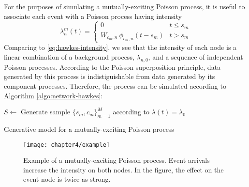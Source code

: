 		For the purposes of simulating a mutually-exciting Poisson process, it is useful to associate each event with a Poisson process having intensity
		\begin{equation}
			\lambda_n^m(t) = \begin{cases}
						             0 & t \le s_m \\
						             W_{c_m, n} \ \phi_{c_m, n}(t - s_m) & t > s_m
						      		 \end{cases}
		\end{equation}
		Comparing to \eqref{eq:hawkes-intensity}, we see that the intensity of each node is a linear combination of a background process, $\lambda_{n,0}$, and a sequence of independent Poisson processes. According to the Poisson superposition principle, data generated by this process is indistiguishable from data generated by its component processes. Therefore, the process can be simulated according to Algorithm \ref{algo:network-hawkes}:

		\begin{algorithm}
				\begin{algorithmic}
					\vspace{1mm}
					\STATE $S \gets$ Generate sample $\{s_m, c_m\}_{m=1}^M$ according to $\lambda(t) = \lambda_0$
					\REPEAT
						\ENDFOR
			\end{algorithmic}
			\caption{Generative model for a mutually-exciting Poisson process}
			\label{algo:network-hawkes}
		\end{algorithm}

		\begin{figure}[t]
			\small
			\linespread{1}
			\centering
			\label{fig:example_chapter4}
			\texttt{[image: chapter4/example]}
			\captionsetup{skip=-30pt, labelsep=colon, font=footnotesize, width=\linewidth}
			\caption[Example of a mutually-exciting Poisson process.]{Example of a mutually-exciting Poisson process. Event arrivals increase the intensity on both nodes. In the figure, the effect on the event node is twice as strong.}
		\end{figure}

